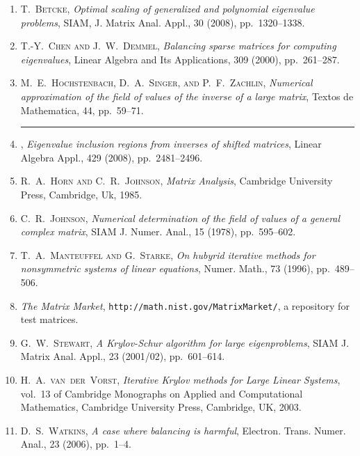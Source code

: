 \documentclass{article}
\begin{document}
\begin{enumerate}
\setlength{\itemsep}{0pt}
\footnotesize

\item \textsc{T.~Betcke}, \emph{Optimal scaling of generalized and
  polynomial eigenvalue problems}, SIAM, J. Matrix Anal. Appl., 30
  (2008), pp.~1320--1338.

\item \textsc{T.-Y.~Chen and J.~W.~Demmel}, \emph{Balancing sparse
  matrices for computing eigenvalues}, Linear Algebra and Its
  Applications, 309 (2000), pp.~261--287.

\item \textsc{M.~E.~Hochstenbach, D.~A.~Singer, and P.~F.~Zachlin},
  \emph{Numerical approximation of the field of values of the inverse of
  a large matrix}, Textos de Mathematica, 44, pp.~59--71.

\item \rule{1cm}{1pt}, \emph{Eigenvalue inclusion regions from inverses
  of shifted matrices}, Linear Algebra Appl., 429 (2008),
  pp.~2481--2496.

\item \textsc{R.~A.~Horn and C.~R.~Johnson}, \emph{Matrix Analysis},
  Cambridge University Press, Cambridge, Uk, 1985.

\item \textsc{C.~R.~Johnson}, \emph{Numerical determination of the field
  of values of a general complex matrix}, SIAM J. Numer. Anal., 15
  (1978), pp.~595--602.

\item \textsc{T.~A.~Manteuffel and G.~Starke}, \emph{On hubyrid
  iterative methods for nonsymmetric systems of linear equations},
  Numer.  Math., 73 (1996), pp.~489--506.

\item \emph{The Matrix Market},
  \texttt{http://math.nist.gov/MatrixMarket/}, a repository for test
  matrices.

\item \textsc{G.~W.~Stewart}, \emph{A Krylov-Schur algorithm for large
  eigenproblems}, SIAM J. Matrix Anal. Appl., 23 (2001/02),
  pp.~601--614.

\item \textsc{H.~A.~van~der~Vorst}, \emph{Iterative Krylov methods for
  Large Linear Systems}, vol.~13 of Cambridge Monographs on Applied and
  Computational Mathematics, Cambridge University Press, Cambridge, UK,
  2003.

\item \textsc{D.~S.~Watkins}, \emph{A case where balancing is harmful},
  Electron. Trans. Numer. Anal., 23 (2006), pp.~1--4.

\end{enumerate}
\end{document}
